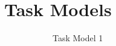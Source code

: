 \documentclass[5pt]{article} %
\begin{document}
\newpage
\section{Task Models}
\begin{figure}[h]
\centering
\begin{subfigure}{.5\textwidth}
\caption{Task Model 1}
\end{subfigure}
\begin{subfigure}{.5\textwidth}

\end{subfigure}
\end{figure}
\end{document}
